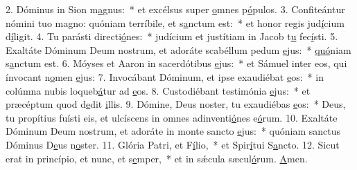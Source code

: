 2. Dóminus in Sion m\uline{a}gnus:~* et excélsus super \uline{o}mnes p\uline{ó}pulos.
3. Confiteántur nómini tuo magno: quóniam terríbile, et s\uline{a}nctum est:~* et honor regis jud\uline{í}cium d\uline{í}ligit.
4. Tu parásti directi\uline{ó}nes:~* judícium et justítiam in Jacob t\uline{u} fec\uline{í}sti.
5. Exaltáte Dóminum Deum nostrum, et adoráte scabéllum pedum \uline{e}jus:~* \uline{quó}niam s\uline{a}nctum est.
6. Móyses et Aaron in sacerdótibus \uline{e}jus:~* et Sámuel inter eos, qui ínvocant n\uline{o}men \uline{e}jus:
7. Invocábant Dóminum, et ipse exaudiébat \uline{e}os:~* in colúmna nubis loqueb\uline{á}tur ad \uline{e}os.
8. Custodiébant testimónia \uline{e}jus:~* et præcéptum quod d\uline{e}dit \uline{i}llis.
9. Dómine, Deus noster, tu exaudiébas \uline{e}os:~* Deus, tu propítius fuísti eis, et ulcíscens in omnes adinventi\uline{ó}nes e\uline{ó}rum.
10. Exaltáte Dóminum Deum nostrum, et adoráte in monte sancto \uline{e}jus:~* quóniam sanctus Dóminus D\uline{e}us n\uline{o}ster.
11. Glória Patri, et F\uline{í}lio,~* et Spir\uline{í}tui S\uline{a}ncto.
12. Sicut erat in princípio, et nunc, et s\uline{e}mper,~* et in sǽcula sæcul\uline{ó}rum. \uline{A}men.
